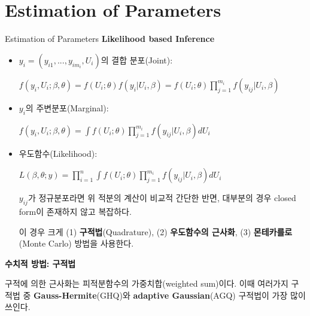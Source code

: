 \documentclass[9pt, xelatex]{beamer}
\begin{document}
\section{Estimation of Parameters}{
	\begin{frame}[allowframebreaks]{Estimation of Parameters}
		\textbf{Likelihood based Inference}
		\vspace{4mm}
		
		\begin{itemize}
			\item $y_{i}=(y_{i1},...,y_{im_{i}}, U_{i})$의 결합 분포(Joint):
			
			\begin{center}
				$f(y_{i},U_{i};\beta,\theta)=f(U_{i};\theta)f(y_{i}|U_{i},\beta)=f(U_{i};\theta)\prod_{j=1}^{m_{i}} f(y_{ij}|U_{i},\beta)$
			\end{center}
			\vspace{2mm}
			
			\item $y_{i}$의 주변분포(Marginal):
			
			\begin{center}
				$f(y_{i},U_{i};\beta,\theta)=\int f(U_{i};\theta)\prod_{j=1}^{m_{i}} f(y_{ij}|U_{i},\beta)dU_{i}$
			\end{center}
			\vspace{2mm}
			
			\item 우도함수(Likelihood):
			
			\begin{center}
				$L(\beta,\theta; y)=\prod_{i=1}^{n}\int f(U_{i};\theta)\prod_{j=1}^{m_{i}} f(y_{ij}|U_{i},\beta)dU_{i}$	
			\end{center}
			
			\vspace{2mm}
			
			$y_{ij}$가 정규분포라면 위 적분의 계산이 비교적 간단한 반면, 대부분의 경우 closed form이 존재하지 않고 복잡하다.
			\vspace{2mm}
			
			이 경우 크게 (1) \textbf{구적법}(Quadrature), (2) \textbf{우도함수의 근사화}, (3) \textbf{몬테카를로}(Monte Carlo) 방법을 사용한다.
		\end{itemize}
		
		\framebreak
		\textbf{수치적 방법: 구적법}
		\vspace{4mm}
		
		구적에 의한 근사화는 피적분함수의 가중치합(weighted sum)이다. 이때 여러가지 구적법 중 \textbf{Gauss-Hermite}(GHQ)와 \textbf{adaptive Gaussian}(AGQ) 구적법이 가장 많이 쓰인다.
		\vspace{2mm}
		

\end{frame}}
\end{document}
